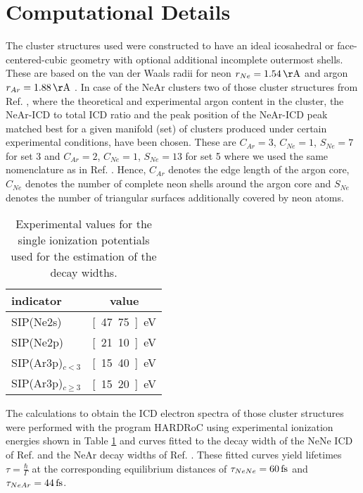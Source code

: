 \section{Computational Details}
\label{sec:computational}
The cluster structures used were constructed to have an ideal icosahedral or
face-centered-cubic geometry with optional additional incomplete outermost
shells. These are based on the van der Waals radii for neon
$r_{Ne}=\unit[1.54]{\AA}$
and argon $r_{Ar}=\unit[1.88]{\AA}$ \cite{Bondi64}.
In case of the NeAr clusters two of those
cluster structures from Ref. \cite{Fasshauer14_1}, where the theoretical
and experimental argon content in the cluster,
the NeAr-ICD to total
ICD ratio and the peak position of the NeAr-ICD peak matched best for a given
manifold (set) of clusters produced under certain experimental conditions,
have been chosen.
These are $C_{Ar}=3$, $C_{Ne}=1$, $S_{Ne}=7$ for set 3
and $C_{Ar}=2$, $C_{Ne}=1$, $S_{Ne}=13$ for set 5 where we used the same
nomenclature as in Ref. \cite{Fasshauer14_1}. Hence, $C_{Ar}$ denotes
the edge length of the argon core, $C_{Ne}$ denotes the number of complete
neon shells around the argon core and $S_{Ne}$ denotes the number of 
triangular surfaces additionally covered by neon atoms.


\begin{table}[h]
 \caption{Experimental values for the single ionization potentials
          \cite{Fasshauer14_1}
          used for the estimation of the decay widths.}
 \label{table:exp_input}
 \centering
 \begin{tabular}{lc}
  \toprule
  indicator            &  value \\
  \midrule
  SIP(Ne2s)            &  \unit[47.75]{eV} \\
  SIP(Ne2p)            &  \unit[21.10]{eV} \\
  SIP(Ar3p)$_{c<3}$    &  \unit[15.40]{eV} \\
  SIP(Ar3p)$_{c\ge 3}$ &  \unit[15.20]{eV} \\
  \bottomrule
 \end{tabular}
\end{table}


The calculations to obtain the ICD electron spectra of those cluster
structures were performed with
the program HARDRoC \cite{HARDRoC} using experimental ionization energies shown
in Table \ref{table:exp_input} and curves fitted to the decay width of the
NeNe ICD of Ref. \cite{Averbukh06_1} and the NeAr decay widths of Ref.
\cite{Fasshauer14_1}. These fitted curves yield lifetimes
$\tau=\frac{\hbar}{\Gamma}$ at the corresponding equilibrium distances of
$\tau_{NeNe}= \unit[60]{fs}$ and
$\tau_{NeAr}= \unit[44]{fs}$.
